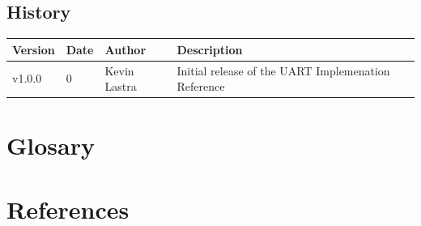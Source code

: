 \documentclass[12pt]{article}
\begin{document}
\subsection{History}
\begin{tabular}{|p{1.5cm}|p{1.5cm}|p{2.5cm}|p{7cm}|}
  \hline
  Version & Date & Author & Description \\
  \hline
  v1.0.0 & 0 & Kevin Lastra & Initial release of the UART Implemenation Reference \\
  \hline
\end{tabular}
\section{Glosary}
\section{References}
\end{document}
